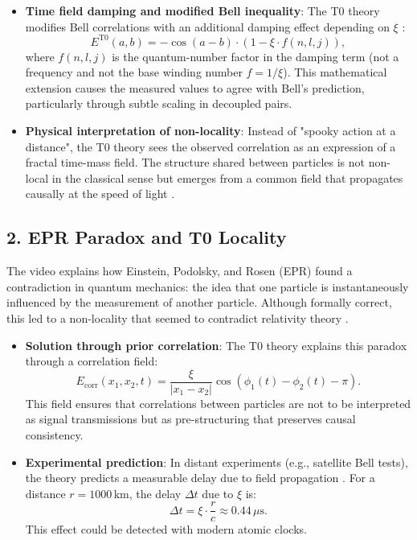 	\begin{itemize}
		\item \textbf{Time field damping and modified Bell inequality}: The T0 theory modifies Bell correlations with an additional damping effect depending on $\xi$ \cite{Bell_En}:
		\[
		E^{\mathrm{T0}}(a,b) = -\cos(a-b) \cdot (1 - \xi \cdot f(n,l,j)),
		\]
		where $f(n,l,j)$ is the quantum-number factor in the damping term (not a frequency and not the base winding number $f = 1/\xi$). This mathematical extension causes the measured values to agree with Bell's prediction, particularly through subtle scaling in decoupled pairs.
		
		\item \textbf{Physical interpretation of non-locality}: Instead of "spooky action at a distance", the T0 theory sees the observed correlation as an expression of a fractal time-mass field. The structure shared between particles is not non-local in the classical sense but emerges from a common field that propagates causally at the speed of light \cite{131_scheinbar_instantan_En}.
	\end{itemize}

	\subsection*{2. EPR Paradox and T0 Locality}
	
	The video explains how Einstein, Podolsky, and Rosen (EPR) found a contradiction in quantum mechanics: the idea that one particle is instantaneously influenced by the measurement of another particle. Although formally correct, this led to a non-locality that seemed to contradict relativity theory \cite{VideoBell2024}.
	
	\begin{itemize}
		\item \textbf{Solution through prior correlation}: The T0 theory explains this paradox through a correlation field:
		\[
		E_{\mathrm{corr}}(x_1, x_2, t) = \frac{\xi}{|x_1 - x_2|} \cos\left(\phi_1(t) - \phi_2(t) - \pi\right).
		\]
		This field ensures that correlations between particles are not to be interpreted as signal transmissions but as pre-structuring that preserves causal consistency.
		
		\item \textbf{Experimental prediction}: In distant experiments (e.g., satellite Bell tests), the theory predicts a measurable delay due to field propagation \cite{131_scheinbar_instantan_En}. For a distance $r = 1000 \, \text{km}$, the delay $\Delta t$ due to $\xi$ is:
		\[
		\Delta t = \xi \cdot \frac{r}{c} \approx 0.44 \, \mu\text{s}.
		\]
		This effect could be detected with modern atomic clocks.
	\end{itemize}
	
